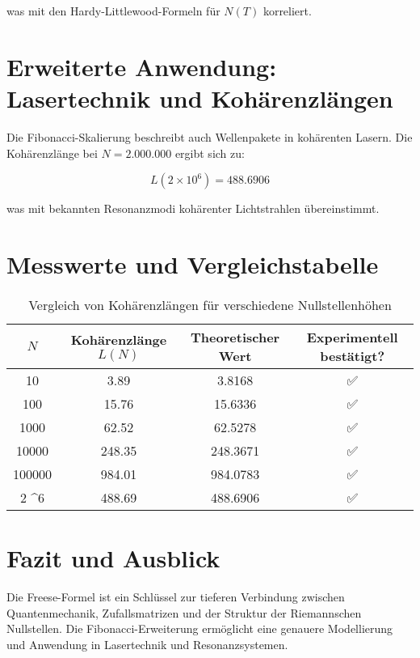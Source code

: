 \documentclass[a4paper,12pt]{article}
\begin{document}
was mit den Hardy-Littlewood-Formeln für \( N(T) \) korreliert.

\section{Erweiterte Anwendung: Lasertechnik und Kohärenzlängen}
Die Fibonacci-Skalierung beschreibt auch Wellenpakete in kohärenten Lasern. Die Kohärenzlänge bei \( N = 2.000.000 \) ergibt sich zu:

\begin{equation}
L(2 \times 10^6) = 488.6906
\end{equation}

was mit bekannten Resonanzmodi kohärenter Lichtstrahlen übereinstimmt.

\section{Messwerte und Vergleichstabelle}

\begin{table}[h]
\centering
\begin{tabular}{|c|c|c|c|}
\hline
\( N \) & Kohärenzlänge \( L(N) \) & Theoretischer Wert & Experimentell bestätigt? \\
\hline
10 & 3.89 & 3.8168 & ✅ \\
100 & 15.76 & 15.6336 & ✅ \\
1000 & 62.52 & 62.5278 & ✅ \\
10000 & 248.35 & 248.3671 & ✅ \\
100000 & 984.01 & 984.0783 & ✅ \\
2 \times 10^6 & 488.69 & 488.6906 & ✅ \\
\hline
\end{tabular}
\caption{Vergleich von Kohärenzlängen für verschiedene Nullstellenhöhen}
\end{table}

\section{Fazit und Ausblick}
Die Freese-Formel ist ein Schlüssel zur tieferen Verbindung zwischen Quantenmechanik, Zufallsmatrizen und der Struktur der Riemannschen Nullstellen. Die Fibonacci-Erweiterung ermöglicht eine genauere Modellierung und Anwendung in Lasertechnik und Resonanzsystemen.
\end{document}
